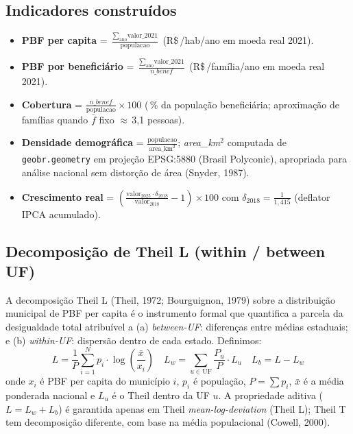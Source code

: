 \documentclass[12pt,a4paper,oneside]{article}
\newcommand{\rs}{R\$\,}
\begin{document}
\subsection{Indicadores construídos}\label{sec:metodo:indicadores}

\begin{itemize}\itemsep3pt
\item \textbf{PBF per capita} = $\frac{\sum_{\text{ano}} \text{valor\_2021}}{\text{populacao}}$
  (\rs/hab/ano em moeda real 2021).
\item \textbf{PBF por beneficiário} = $\frac{\sum_{\text{ano}} \text{valor\_2021}}{n\_benef}$
  (\rs/família/ano em moeda real 2021).
\item \textbf{Cobertura} = $\frac{n\_benef}{\text{populacao}} \times 100$ (\,\% da
  população beneficiária; aproximação de famílias quando $\bar{f}$ fixo
  $\approx$\,3{,}1 pessoas).
\item \textbf{Densidade demográfica} = $\frac{\text{populacao}}{\text{area\_km}^2}$;
  \textit{area\_km}$^2$ computada de \texttt{geobr.geometry} em projeção
  EPSG:5880 (Brasil Polyconic), apropriada para análise nacional sem
  distorção de área (Snyder, 1987).
\item \textbf{Crescimento real} = $\left(\frac{\text{valor}_{2025} \cdot
  \delta_{2018}}{\text{valor}_{2018}} - 1\right)\times 100$ com $\delta_{2018}
  = \frac{1}{1{,}415}$ (deflator IPCA acumulado).
\end{itemize}

\subsection{Decomposição de Theil L (within / between UF)}\label{sec:metodo:theil}

A decomposição Theil L (Theil, 1972; Bourguignon, 1979) sobre a
distribuição municipal de PBF per capita é o instrumento formal que
quantifica a parcela da desigualdade total atribuível a (a)
\textit{between-UF}: diferenças entre médias estaduais; e
(b) \textit{within-UF}: dispersão dentro de cada estado. Definimos:
\[
L = \frac{1}{P} \sum_{i=1}^{N} p_i \cdot \log\!\left(\frac{\bar{x}}{x_i}\right)
\quad
L_w = \sum_{u\in\text{UF}} \frac{P_u}{P} \cdot L_u
\quad
L_b = L - L_w
\]
onde $x_i$ é PBF per capita do município $i$, $p_i$ é população, $P=\sum p_i$,
$\bar{x}$ é a média ponderada nacional e $L_u$ é o Theil dentro da UF $u$. A
propriedade aditiva ($L = L_w + L_b$) é garantida apenas em Theil
\textit{mean-log-deviation} (Theil L); Theil T tem decomposição diferente,
com base na média populacional (Cowell, 2000).
\end{document}
